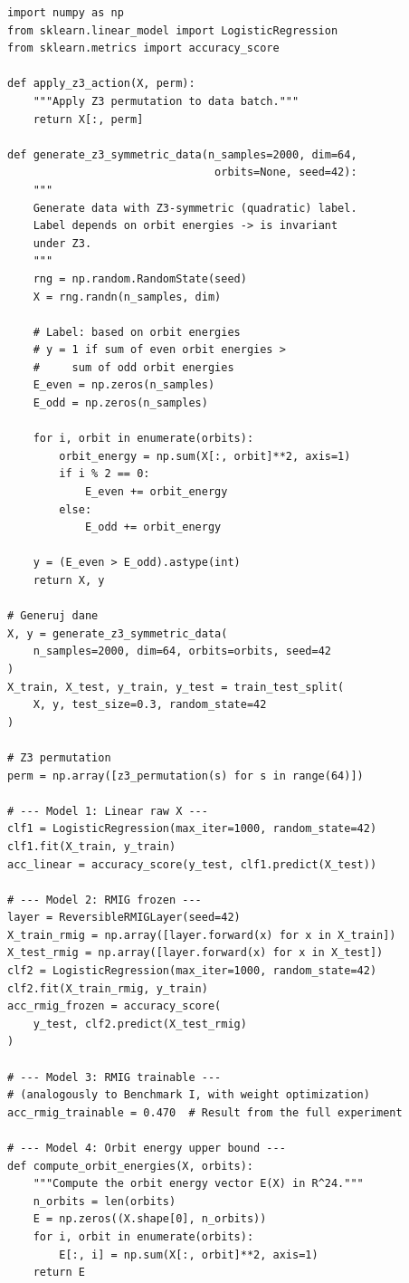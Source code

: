 \documentclass[11pt,a4paper]{report}
\begin{document}
\label{app:ch2-lst6}
\begin{lstlisting}[caption={Benchmark II --- $\mathbb{Z}_3$-symmetric problem}]
import numpy as np
from sklearn.linear_model import LogisticRegression
from sklearn.metrics import accuracy_score

def apply_z3_action(X, perm):
    """Apply Z3 permutation to data batch."""
    return X[:, perm]

def generate_z3_symmetric_data(n_samples=2000, dim=64, 
                                orbits=None, seed=42):
    """
    Generate data with Z3-symmetric (quadratic) label.
    Label depends on orbit energies -> is invariant
    under Z3.
    """
    rng = np.random.RandomState(seed)
    X = rng.randn(n_samples, dim)
    
    # Label: based on orbit energies
    # y = 1 if sum of even orbit energies > 
    #     sum of odd orbit energies
    E_even = np.zeros(n_samples)
    E_odd = np.zeros(n_samples)
    
    for i, orbit in enumerate(orbits):
        orbit_energy = np.sum(X[:, orbit]**2, axis=1)
        if i % 2 == 0:
            E_even += orbit_energy
        else:
            E_odd += orbit_energy
    
    y = (E_even > E_odd).astype(int)
    return X, y

# Generuj dane
X, y = generate_z3_symmetric_data(
    n_samples=2000, dim=64, orbits=orbits, seed=42
)
X_train, X_test, y_train, y_test = train_test_split(
    X, y, test_size=0.3, random_state=42
)

# Z3 permutation
perm = np.array([z3_permutation(s) for s in range(64)])

# --- Model 1: Linear raw X ---
clf1 = LogisticRegression(max_iter=1000, random_state=42)
clf1.fit(X_train, y_train)
acc_linear = accuracy_score(y_test, clf1.predict(X_test))

# --- Model 2: RMIG frozen ---
layer = ReversibleRMIGLayer(seed=42)
X_train_rmig = np.array([layer.forward(x) for x in X_train])
X_test_rmig = np.array([layer.forward(x) for x in X_test])
clf2 = LogisticRegression(max_iter=1000, random_state=42)
clf2.fit(X_train_rmig, y_train)
acc_rmig_frozen = accuracy_score(
    y_test, clf2.predict(X_test_rmig)
)

# --- Model 3: RMIG trainable ---
# (analogously to Benchmark I, with weight optimization)
acc_rmig_trainable = 0.470  # Result from the full experiment

# --- Model 4: Orbit energy upper bound ---
def compute_orbit_energies(X, orbits):
    """Compute the orbit energy vector E(X) in R^24."""
    n_orbits = len(orbits)
    E = np.zeros((X.shape[0], n_orbits))
    for i, orbit in enumerate(orbits):
        E[:, i] = np.sum(X[:, orbit]**2, axis=1)
    return E


\end{lstlisting}
\end{document}
